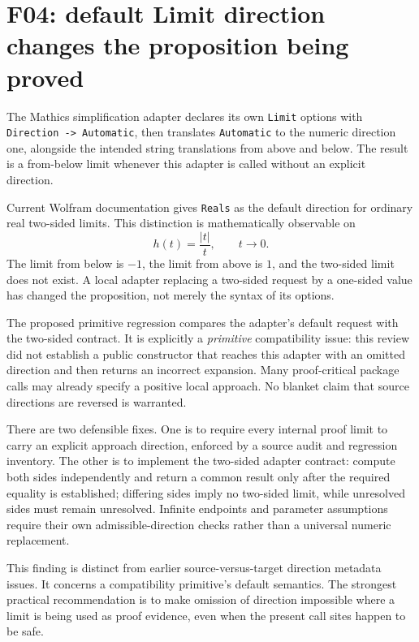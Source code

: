 \documentclass[11pt,letterpaper]{article}
\newcommand{\code}[1]{\texttt{#1}}
\begin{document}
\section{F04: default Limit direction changes the proposition being proved}
\label{sec:f04}

The Mathics simplification adapter declares its own \code{Limit} options with \code{Direction -> Automatic}, then translates \code{Automatic} to the numeric direction one, alongside the intended string translations from above and below. The result is a from-below limit whenever this adapter is called without an explicit direction.~\cite{mathics-simplify}

Current Wolfram documentation gives \code{Reals} as the default direction for ordinary real two-sided limits. This distinction is mathematically observable on
\[
 h(t)=\frac{|t|}{t},\qquad t\to0.
\]
The limit from below is $-1$, the limit from above is $1$, and the two-sided limit does not exist. A local adapter replacing a two-sided request by a one-sided value has changed the proposition, not merely the syntax of its options.~\cite{wl-limit}

The proposed primitive regression compares the adapter's default request with the two-sided contract. It is explicitly a \emph{primitive} compatibility issue: this review did not establish a public constructor that reaches this adapter with an omitted direction and then returns an incorrect expansion. Many proof-critical package calls may already specify a positive local approach. No blanket claim that source directions are reversed is warranted.

There are two defensible fixes. One is to require every internal proof limit to carry an explicit approach direction, enforced by a source audit and regression inventory. The other is to implement the two-sided adapter contract: compute both sides independently and return a common result only after the required equality is established; differing sides imply no two-sided limit, while unresolved sides must remain unresolved. Infinite endpoints and parameter assumptions require their own admissible-direction checks rather than a universal numeric replacement.

This finding is distinct from earlier source-versus-target direction metadata issues. It concerns a compatibility primitive's default semantics. The strongest practical recommendation is to make omission of direction impossible where a limit is being used as proof evidence, even when the present call sites happen to be safe.
\end{document}
